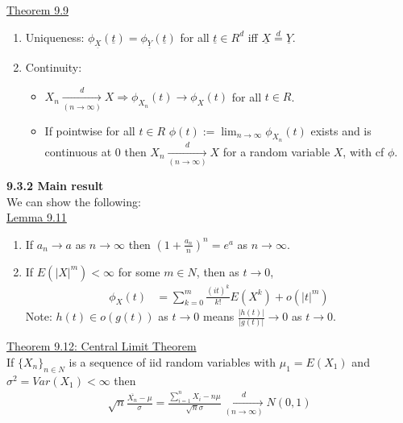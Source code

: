 \documentclass[10pt,letterpaper]{article}
\begin{document}
\underline{Theorem 9.9}\\

				\begin{enumerate}
					\item Uniqueness: $\phi_{\underline{X}}(\underline{t})=\phi_{\underline{Y}}(\underline{t})$ for all $\underline{t}\in R^d$ iff $\underline{X}\stackrel{d}{=}\underline{Y}$.
					
					\item Continuity:
					\begin{itemize}
						\item $X_n\underset{(n\to\infty)}{\overset{d}{\to}}X\Rightarrow\phi_{X_n}(t)\to\phi_X(t)$ for all $t\in R$.
						
						\item If pointwise for all $t\in R$ $\phi(t):=\lim_{n\to\infty}\phi_{X_n}(t)$ exists and is continuous at 0 then $X_n\underset{(n\to\infty)}{\overset{d}{\to}}X$ for a random variable $X$, with cf $\phi$.
					\end{itemize}
				\end{enumerate}

\textbf{9.3.2 Main result}\\

We can show the following:\\

\underline{Lemma 9.11}\\

        \begin{enumerate}
					\item If $a_n\to a$ as $n\to\infty$ then $(1+\frac{a_n}{n})^n=e^a$ as $n\to\infty$.
					
					\item If $E(|X|^m)<\infty$ for some $m\in N$, then as $t\to 0$,
					\begin{align*}
						\phi_{X}(t)&=\sum_{k=0}^m\frac{(it)^k}{k!}E(X^k)+o(|t|^m)
					\end{align*}
					Note: $h(t)\in o(g(t))$ as $t\to 0$ means $\frac{|h(t)|}{|g(t)|}\to0$ as $t\to 0$.
				\end{enumerate}

\underline{Theorem 9.12: Central Limit Theorem}\\

				If $\{X_n\}_{n\in N}$ is a sequence of iid random variables with $\mu_1=E(X_1)$ and $\sigma^2=Var(X_1)<\infty$ then
				\begin{align*}
					\sqrt{n}\frac{\overline{X_n}-\mu}{\sigma}=\frac{\sum_{i=1}^nX_i-n\mu}{\sqrt{n}\sigma}\underset{(n\to\infty)}{\overset{d}{\to}}N(0, 1)
				\end{align*}
\end{document}
